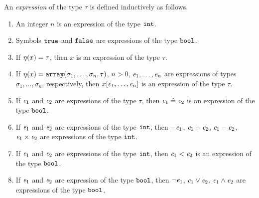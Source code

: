 \begin{definition}\label{def:boogie/expression}
An \emph{expression} of the type $\tau$ is defined inductively as follows.
\begin{enumerate}
  \item An integer $n$ is an expression of the type $\mathtt{int}$.
  \item Symbols $\mathtt{true}$ and $\mathtt{false}$ are expressions of the type $\mathtt{bool}$.
  \item If $\eta(x)=\tau$, then $x$ is an expression of the type $\tau$.
  \item If $\eta(x)=\mathtt{array}(\sigma_1,\ldots,\sigma_n,\tau)$, $n > 0$, $\mathit{e}_1,\ldots,\mathit{e}_n$ are expressions of types $\sigma_1,\allowbreak\ldots,\allowbreak\sigma_n$, respectively, then $x[\mathit{e}_1,\ldots,\mathit{e}_n]$ is an expression of the type $\tau$.
  \item If $\mathit{e}_1$ and $\mathit{e}_2$ are expressions of the type $\tau$, then $\mathit{e}_1 \doteq \mathit{e}_2$ is an expression of the type $\mathtt{bool}$.
  \item If $\mathit{e}_1$ and $\mathit{e}_2$ are expressions of the type $\mathtt{int}$, then $-\mathit{e}_1$, $\mathit{e}_1+\mathit{e}_2$, $\mathit{e}_1-\mathit{e}_2$, $\mathit{e}_1\times\mathit{e}_2$ are expressions of the type $\mathtt{int}$.
  \item If $\mathit{e}_1$ and $\mathit{e}_2$ are expressions of the type $\mathtt{int}$, then $\mathit{e}_1<\mathit{e}_2$ is an expression of the type $\mathtt{bool}$.
  \item If $\mathit{e}_1$ and $\mathit{e}_2$ are expression of the type $\mathtt{bool}$, then $\neg\mathit{e}_1$, $\mathit{e}_1\vee\mathit{e}_2$, $\mathit{e}_1\wedge\mathit{e}_2$ are expressions of the type $\mathtt{bool}$. \QED
\end{enumerate}
\end{definition}


